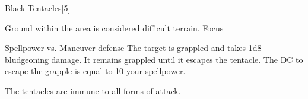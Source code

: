 \begin{spellsection}{Black Tentacles}[5]
    \begin{spellheader}
    \end{spellheader}
    \begin{spellcontent}
        \begin{spelltargetinginfo}
        \end{spelltargetinginfo}
        \begin{spelleffects}
            \spelleffect Ground within the area is considered difficult terrain.
            \spelldur Focus
        \end{spelleffects}
    \end{spellcontent}
    \begin{spellsubcontent}
        \begin{spelltargetinginfo}
        \end{spelltargetinginfo}
        \begin{spelleffects}
            \begin{spellattack}{Spellpower vs. Maneuver defense}
                \spellsuccess The target is grappled and takes 1d8 bludgeoning damage. It remains grappled until it escapes the tentacle. The DC to escape the grapple is equal to 10 \add your spellpower.
            \end{spellattack}
        \end{spelleffects}
    \end{spellsubcontent}
    \begin{spellfooter}
        \spellnotes The tentacles are immune to all forms of attack.
        \miscastyou
    \end{spellfooter}
\end{spellsection}

